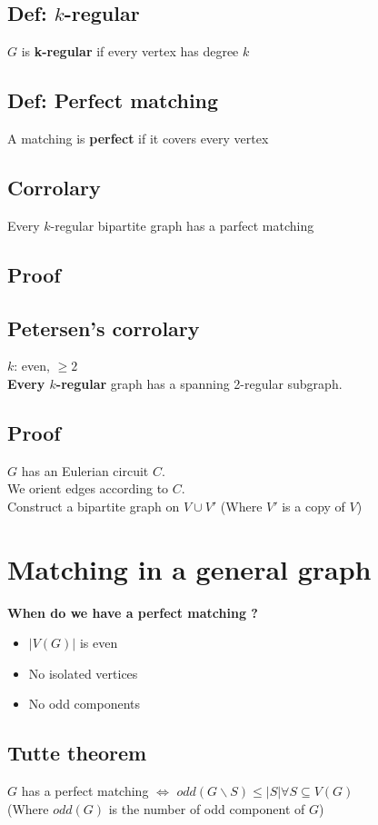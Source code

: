         \subsection{Def: $k$-regular}
            $G$ is \textbf{k-regular} if every vertex has degree $k$
        \subsection{Def: Perfect matching}
            A matching is \textbf{perfect} if it covers every vertex
        \subsection{Corrolary}
            Every $k$-regular bipartite graph has a parfect matching
        \subsection{Proof}
        \subsection{Petersen's corrolary}
            $k$: even, $\geq 2$\\
            \textbf{Every $k$-regular} graph has a spanning 2-regular subgraph.\\
        \subsection{Proof}
            $G$ has an Eulerian circuit $C$.\\
            We orient edges according to $C$.\\
            Construct a bipartite graph on $V\cup V'$ (Where $V'$ is a copy of $V$)
    \section{Matching in a general graph}
        \textbf{When do we have a perfect matching ?}\\
        \begin{itemize}
            \item $|V(G)|$ is even
            \item No isolated vertices
            \item No odd components
        \end{itemize}
        \subsection{Tutte theorem}
            $G$ has a perfect matching $\Leftrightarrow$ $odd(G\backslash S)\leq|S| \forall S\subseteq V(G)$\\
            (Where $odd(G)$ is the number of odd component of $G$)
